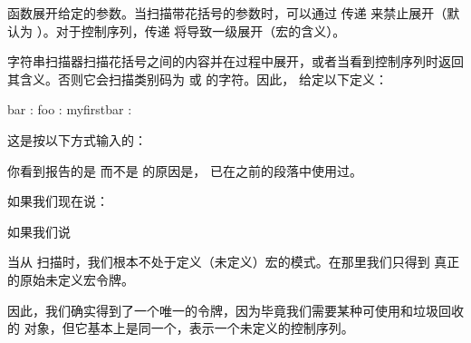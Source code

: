  函数展开给定的参数。当扫描带花括号的参数时，可以通过
传递  来禁止展开（默认为 ）。对于控制序列，传递
 将导致一级展开（宏的含义）。

字符串扫描器扫描花括号之间的内容并在过程中展开，或者当看到控制序列时返回
其含义。否则它会扫描类别码为  或  的字符。因此，
给定以下定义：

\begin{typing}
\def\bar{bar}
\def\foo{foo-\bar}
\end{typing}
bar        : 
foo        : 
myfirstbar : 

\begin{flushleft}

\end{flushleft}

这是按以下方式输入的：



你看到报告的是  而不是  的原因是，
\type {\bar} 已在之前的段落中使用过。

如果我们现在说：

\begin{typing}
\def\foo{}
\end{typing}

如果我们说

\begin{typing}
\def\foo{\bar}
\end{typing}

当从 \LUA 扫描时，我们根本不处于定义（未定义）宏的模式。在那里我们只得到
真正的原始未定义宏令牌。

\begin{typing}
\myfirstbar
{}\mysecondbar
{}\mythirdbar
\end{typing}

\begin{flushleft}

因此，我们确实得到了一个唯一的令牌，因为毕竟我们需要某种可使用和垃圾回收的
\LUA 对象，但它基本上是同一个，表示一个未定义的控制序列。
\end{flushleft}

\section{}

